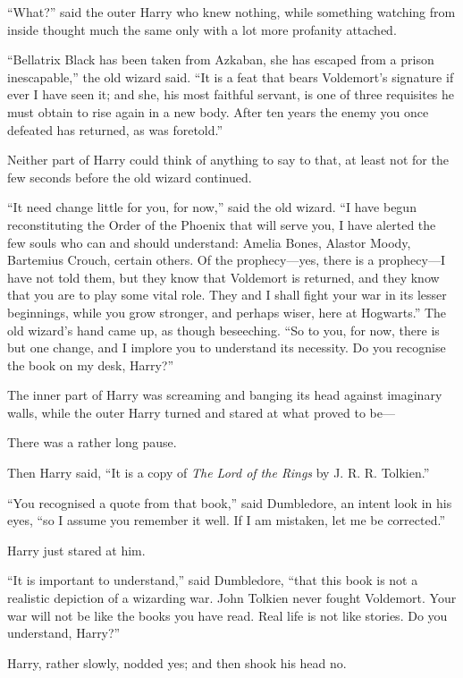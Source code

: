 ``What?'' said the outer Harry who knew nothing, while something
watching from inside thought much the same only with a lot more
profanity attached.

``Bellatrix Black has been taken from Azkaban, she has escaped from a
prison inescapable,'' the old wizard said. ``It is a feat that bears
Voldemort's signature if ever I have seen it; and she, his most faithful
servant, is one of three requisites he must obtain to rise again in a
new body. After ten years the enemy you once defeated has returned, as
was foretold.''

Neither part of Harry could think of anything to say to that, at least
not for the few seconds before the old wizard continued.

``It need change little for you, for now,'' said the old wizard. ``I
have begun reconstituting the Order of the Phoenix that will serve you,
I have alerted the few souls who can and should understand: Amelia
Bones, Alastor Moody, Bartemius Crouch, certain others. Of the
prophecy---yes, there is a prophecy---I have not told them, but they
know that Voldemort is returned, and they know that you are to play some
vital role. They and I shall fight your war in its lesser beginnings,
while you grow stronger, and perhaps wiser, here at Hogwarts.'' The old
wizard's hand came up, as though beseeching. ``So to you, for now, there
is but one change, and I implore you to understand its necessity. Do you
recognise the book on my desk, Harry?''

The inner part of Harry was screaming and banging its head against
imaginary walls, while the outer Harry turned and stared at what proved
to be---

There was a rather long pause.

Then Harry said, ``It is a copy of \emph{The Lord of the Rings} by J. R.
R. Tolkien.''

``You recognised a quote from that book,'' said Dumbledore, an intent
look in his eyes, ``so I assume you remember it well. If I am mistaken,
let me be corrected.''

Harry just stared at him.

``It is important to understand,'' said Dumbledore, ``that this book is
not a realistic depiction of a wizarding war. John Tolkien never fought
Voldemort. Your war will not be like the books you have read. Real life
is not like stories. Do you understand, Harry?''

Harry, rather slowly, nodded yes; and then shook his head no.

